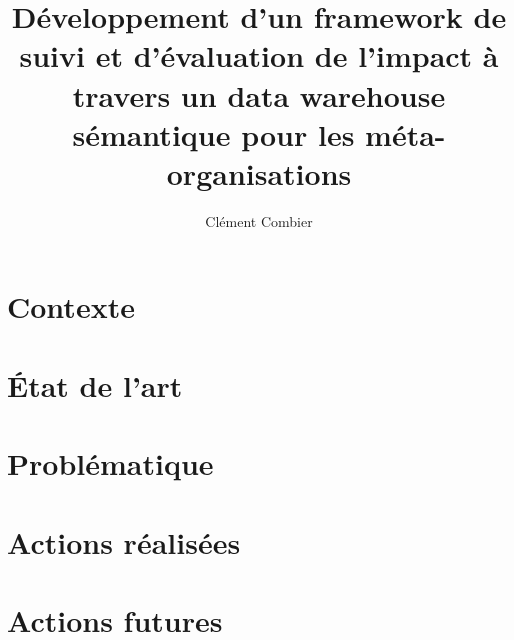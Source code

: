 \documentclass[empty]{fjc2014} %
\title[fjc]{Développement d'un framework de suivi et d'évaluation de l'impact à travers un data warehouse sémantique pour les méta-organisations}
\author{Clément Combier}
\begin{document}
\maketitlepage
\section{Contexte}


\section{État de l'art}


\section{Problématique}
 

\section{Actions réalisées}



\section{Actions futures}



\end{document}
